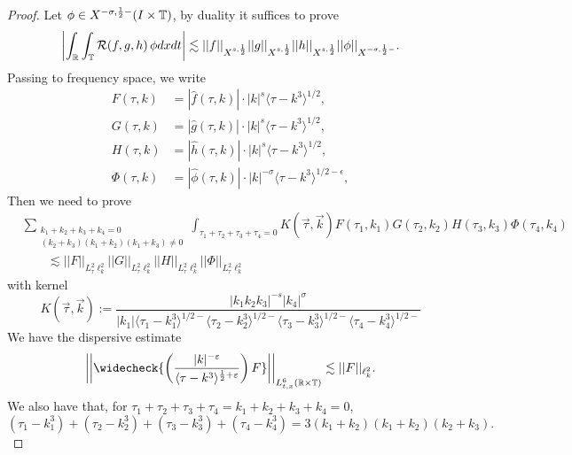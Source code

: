 \begin{proof}
    Let $\phi \in X^{-\sigma, \frac12-} (I \times \mathbb T)$, by duality it suffices to prove 
        \[
            \left| \int_{\mathbb R} \int_\mathbb T  \mathcal R(f, g, h) \, \phi dx dt\right| \lesssim ||f||_{X^{s, \frac12}} ||g||_{X^{s, \frac12}} ||h||_{X^{s, \frac12}} ||\phi||_{X^{-\sigma, \frac12-}}. 
        \]
    Passing to frequency space, we write 
        \begin{align*}
            F (\tau, k)
                &= |\widehat f(\tau, k)| \cdot |k|^s \langle \tau - k^3 \rangle^{1/2}, \\
            G (\tau, k)
                &= |\widehat g(\tau, k)| \cdot |k|^s \langle \tau - k^3 \rangle^{1/2}, \\
            H (\tau, k) 
                &= |\widehat h(\tau, k)| \cdot |k|^s \langle \tau - k^3 \rangle^{1/2},\\
            \Phi (\tau, k)
                &= |\widehat \phi(\tau, k)| \cdot |k|^{-\sigma} \langle \tau - k^3 \rangle^{1/2 - \epsilon},
        \end{align*}
    Then we need to prove 
        \begin{align*}
            &\sum_{\substack{k_1 + k_2 + k_3 + k_4 = 0 \\ (k_2 + k_3)(k_1 + k_2) (k_1 + k_3) \neq 0}} \int_{\tau_1 + \tau_2 + \tau_3 + \tau_4 = 0} K(\vec\tau, \vec k) F(\tau_1, k_1) G(\tau_2, k_2) H(\tau_3, k_3) \Phi(\tau_4, k_4) \\ 
                &\qquad \lesssim ||F||_{L^2_\tau \ell^2_k}  ||G||_{L^2_\tau \ell^2_k}   ||H||_{L^2_\tau \ell^2_k}   ||\Phi||_{L^2_\tau \ell^2_k} 
        \end{align*}
    with kernel 
        \[
            K(\vec\tau, \vec k) := \frac{|k_1 k_2 k_3|^{-s} |k_4|^\sigma}{|k_1| \langle \tau_1 - k_1^3 \rangle^{1/2 -} \langle \tau_2 - k_2^3 \rangle^{1/2 -} \langle \tau_3 - k_3^3 \rangle^{1/2 -} \langle \tau_4 - k_4^3 \rangle^{1/2 -}} 
        \]
    We have the dispersive estimate 
        \begin{align}
            \left|\left| \widecheck{\left( \frac{|k|^{-\epsilon}}{\langle \tau - k^3 \rangle^{\frac12 + \epsilon}} \right) F } \right| \right|_{L^6_{t, x} (\R \times \TT)}
                \lesssim ||F||_{\ell^2_k}.
        \end{align}
    We also have that, for $\tau_1 + \tau_2 + \tau_3 + \tau_4 = k_1 + k_2 + k_3 + k_4 = 0$, 
        \begin{equation}
            (\tau_1 - k_1^3) + (\tau_2 - k_2^3) + (\tau_3 - k_3^3) + (\tau_4 - k_4^3) = 3(k_1 + k_2) (k_1 + k_2)(k_2 + k_3). 

\end{equation}
\end{proof}
